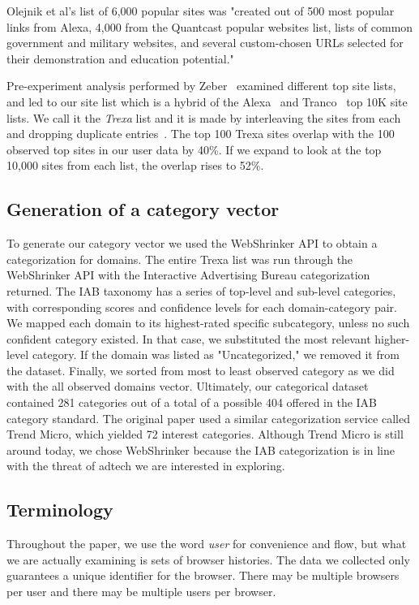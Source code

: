 \documentclass[letterpaper,twocolumn,10pt]{article}
\begin{document}
Olejnik et al's list of 6,000 popular sites was "created out of 500 most popular links from Alexa, 4,000 from the Quantcast popular websites list, lists of common government and military websites, and several custom-chosen URLs selected for their demonstration and education potential."

Pre-experiment analysis performed by Zeber~\cite{zeberTopSiteList} examined different top site lists, and led to our site list which is a hybrid of the Alexa~\cite{amazonAlexaTopSites2019} and Tranco~\cite{lepochatTrancoResearchOrientedTop2018} top 10K site lists.
We call it the \textit{Trexa} list and it is made by interleaving the sites from each and dropping duplicate entries~\cite{firefoxmachinelearningteamMozillaTrexa2020}.
The top 100 Trexa sites overlap with the 100 observed top sites in our user data by 40\%. If we expand to look at the top 10,000 sites from each list, the overlap rises to 52\%.
%
\subsection{Generation of a category vector}
\label{ssec:category-vector-generation}
%
To generate our category vector we used the WebShrinker API \cite{Webshrinker-APIs} to obtain a categorization for domains.
The entire Trexa list was run through the WebShrinker API with the Interactive Advertising Bureau categorization returned. 
The IAB taxonomy has a series of top-level and sub-level categories, with corresponding scores and confidence levels for each domain-category pair. 
We mapped each domain to its highest-rated specific subcategory, unless no such confident category existed. In that case, we substituted the most relevant higher-level category. 
If the domain was listed as "Uncategorized," we removed it from the dataset. 
Finally, we sorted from most to least observed category as we did with the all observed domains vector.
Ultimately, our categorical dataset contained 281 categories out of a total of a possible 404 offered in the IAB category standard.
The original paper used a similar categorization service called Trend Micro, which yielded 72 interest categories.
Although Trend Micro is still around today, we chose WebShrinker because the IAB categorization is in line with the threat of adtech we are interested in exploring.

\subsection{Terminology}
\label{ssec:terminology}
Throughout the paper, we use the word \textit{user} for convenience and flow, but what we are actually examining is sets of browser histories. 
The data we collected only guarantees a unique identifier for the browser. 
There may be multiple browsers per user and there may be multiple users per browser.
\end{document}
